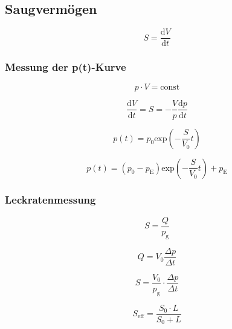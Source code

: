 	\subsection{Saugvermögen}

		\begin{equation}
			S = \frac{\text{d}V}{\text{d}t}
		\end{equation}

		\subsubsection{Messung der p(t)-Kurve}

			\begin{equation}
				p \cdot V = \text{const}
			\end{equation}

			\begin{equation}
				\frac{\text{d}V}{\text{d}t} = S = - \frac{V}{p} \frac{\text{d}p}{\text{d}t}
			\end{equation}

			\begin{equation}
				p(t) = p_0 \text{exp}\left( - \frac{S}{V_0}t \right)
			\end{equation}
				
			\begin{equation}
				p(t) = (p_0 - p_\text{E}) \text{exp}\left( - \frac{S}{V_0}t \right) + p_\text{E}
			\end{equation}

		\subsubsection{Leckratenmessung}

			\begin{equation}
				S = \frac{Q}{p_\text{g}}
			\end{equation}

			\begin{equation}
				Q = V_0 \frac{\Delta p}{\Delta t}
			\end{equation}

			\begin{equation}
				S = \frac{V_0}{p_\text{g}} \cdot \frac{\Delta p}{\Delta t}
			\end{equation}

			\begin{equation}
				S_\text{eff} = \frac{S_0 \cdot L}{S_0 + L}
			\end{equation}

